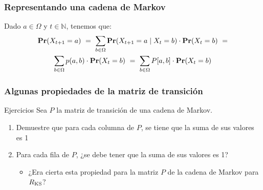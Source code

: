 \begin{frame}
\frametitle{Representando una cadena de Markov}

{\small



Dado $a \in \Omega$ y $t \in \mathbb{N}$, tenemos que:
\begin{multline*}
{\rm {\bf Pr}}(X_{t+1} = a) \ = \ \sum_{b \in \Omega} {\rm {\bf Pr}}(X_{t+1} = a \mid X_{t} = b) \cdot {\rm {\bf Pr}}(X_{t} = b) \ =
\\ 
\sum_{b \in \Omega} p(a,b) \cdot {\rm {\bf Pr}}(X_{t} = b) \ = \ \sum_{b \in \Omega} P[a,b] \cdot {\rm {\bf Pr}}(X_{t} = b)
\end{multline*}




}

\end{frame}


\begin{frame}
\frametitle{Algunas propiedades de la matriz de transición}

{\small

\begin{exampleblock}{Ejercicios}
Sea $P$ la matriz de transición de una cadena de Markov.
\begin{enumerate}
\item Demuestre que para cada columna de $P$, se tiene que la suma de sus valores es 1


\item Para cada fila de $P$, ¿se debe tener que la suma de sus valores es 1?
\begin{itemize}
\item ¿Era cierta esta propiedad para la matriz $P$ de la cadena de Markov para $R_{\text{KS}}$?
\end{itemize}
\end{enumerate}
\end{exampleblock}

}



\end{frame}

